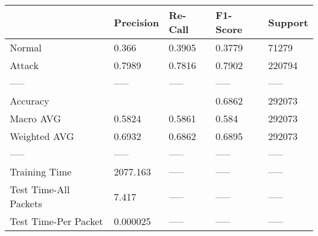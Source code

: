 \begin{tabular}{lllll}
\toprule
{} & Precision & Re-Call & F1-Score & Support \\
\midrule
Normal                &     0.366 &  0.3905 &   0.3779 &   71279 \\
Attack                &    0.7989 &  0.7816 &   0.7902 &  220794 \\
-----                 &     ----- &   ----- &    ----- &   ----- \\
Accuracy              &           &         &   0.6862 &  292073 \\
Macro AVG             &    0.5824 &  0.5861 &    0.584 &  292073 \\
Weighted AVG          &    0.6932 &  0.6862 &   0.6895 &  292073 \\
-----                 &     ----- &   ----- &    ----- &   ----- \\
Training Time         &  2077.163 &   ----- &    ----- &   ----- \\
Test Time-All Packets &     7.417 &   ----- &    ----- &   ----- \\
Test Time-Per Packet  &  0.000025 &   ----- &    ----- &   ----- \\
\bottomrule
\end{tabular}
